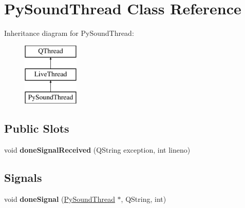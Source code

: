 \hypertarget{classPySoundThread}{\section{Py\+Sound\+Thread Class Reference}
\label{classPySoundThread}
}
Inheritance diagram for Py\+Sound\+Thread\+:\begin{figure}[H]
\begin{center}
\leavevmode
\includegraphics[height=3.000000cm]{classPySoundThread}
\end{center}
\end{figure}
\subsection*{Public Slots}
\begin{DoxyCompactItemize}
\item 
\hypertarget{classPySoundThread_ab840a95275e20cb439369b63612c59cd}{void {\bfseries done\+Signal\+Received} (Q\+String exception, int lineno)}\label{classPySoundThread_ab840a95275e20cb439369b63612c59cd}

\end{DoxyCompactItemize}
\subsection*{Signals}
\begin{DoxyCompactItemize}
\item 
\hypertarget{classPySoundThread_abe6c1331f19a2e74ab586058a1d7f539}{void {\bfseries done\+Signal} (\hyperlink{classPySoundThread}{Py\+Sound\+Thread} $\ast$, Q\+String, int)}\label{classPySoundThread_abe6c1331f19a2e74ab586058a1d7f539}

\end{DoxyCompactItemize}
